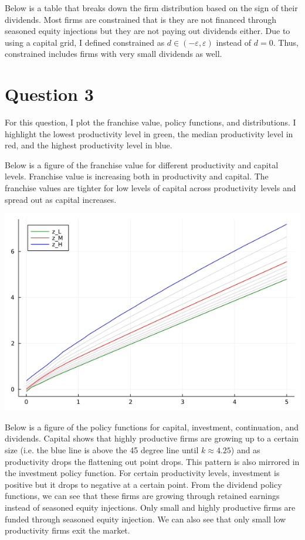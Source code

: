 \documentclass{article}
\begin{document}
Below is a table that breaks down the firm distribution based on the sign of their dividends.  Most firms are constrained that is they are not financed through seasoned equity injections but they are not paying out dividends either.  Due to using a capital grid, I defined constrained as $d \in (-\varepsilon, \varepsilon)$ instead of $d = 0$.  Thus, constrained includes firms with very small dividends as well.

\bigskip


\section*{Question 3}

For this question, I plot the franchise value, policy functions, and distributions.  I highlight the lowest productivity level in green, the median productivity level in red, and the highest productivity level in blue.

Below is a figure of the franchise value for different productivity and capital levels.  Franchise value is increasing both in productivity and capital.  The franchise values are tighter for low levels of capital across productivity levels and spread out as capital increases.

\includegraphics[scale = .5]{value_function.png}

\pagebreak

Below is a figure of the policy functions for capital, investment, continuation, and dividends.  Capital shows that highly productive firms are growing up to a certain size (i.e. the blue line is above the 45 degree line until $k \approx 4.25$) and as productivity drops the flattening out point drops.  This pattern is also mirrored in the investment policy function.  For certain productivity levels, investment is positive but it drops to negative at a certain point. From the dividend policy functions, we can see that these firms are growing through retained earnings instead of seasoned equity injections.  Only small and highly productive firms are funded through seasoned equity injection.  We can also see that only small low productivity firms exit the market.
\end{document}
